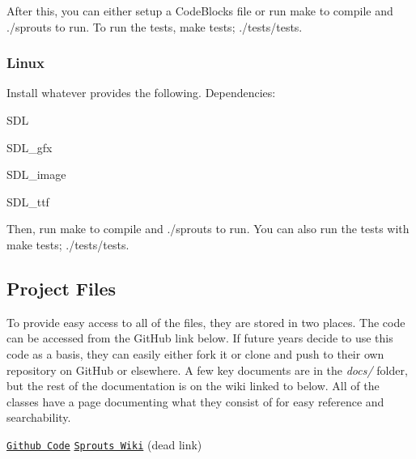 After this, you can either setup a Code\+Blocks file or run {\ttfamily make} to compile and {\ttfamily ./sprouts} to run. To run the tests, {\ttfamily make tests; ./tests/tests}.

\subsubsection*{Linux}

Install whatever provides the following. Dependencies\+:


\begin{DoxyItemize}
\item S\+D\+L
\item S\+D\+L\+\_\+gfx
\item S\+D\+L\+\_\+image
\item S\+D\+L\+\_\+ttf
\end{DoxyItemize}

Then, run {\ttfamily make} to compile and {\ttfamily ./sprouts} to run. You can also run the tests with {\ttfamily make tests; ./tests/tests}.

\subsection*{Project Files }

To provide easy access to all of the files, they are stored in two places. The code can be accessed from the Git\+Hub link below. If future years decide to use this code as a basis, they can easily either fork it or clone and push to their own repository on Git\+Hub or elsewhere. A few key documents are in the {\itshape docs/} folder, but the rest of the documentation is on the wiki linked to below. All of the classes have a page documenting what they consist of for easy reference and searchability.

\href{https://github.com/floft/sprouts}{\tt Github Code} \href{http://sprouts.kingscastle.co/index.php/Main_Page}{\tt Sprouts Wiki} (dead link) 